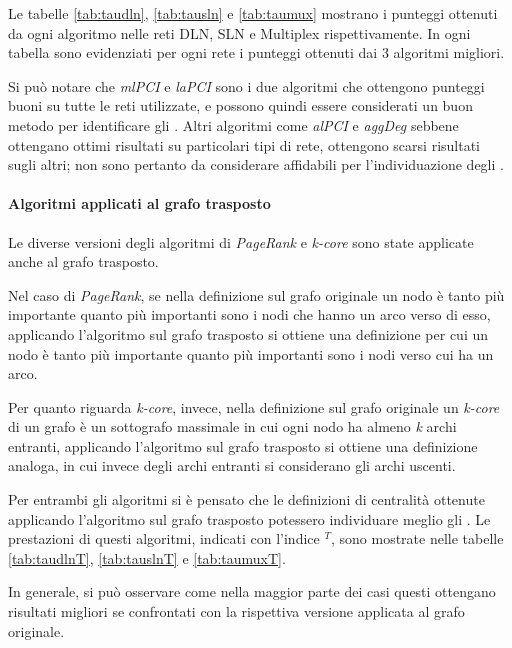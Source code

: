 Le tabelle \ref{tab:taudln}, \ref{tab:tausln} e \ref{tab:taumux} mostrano i punteggi 
ottenuti da ogni algoritmo nelle reti DLN, SLN e Multiplex rispettivamente.
In ogni tabella sono evidenziati per ogni rete i punteggi ottenuti dai \num{3} algoritmi 
migliori. 

Si può notare che \textit{mlPCI} e \textit{laPCI} sono i due algoritmi che ottengono punteggi buoni 
su tutte le reti utilizzate, e possono quindi essere considerati un buon metodo per identificare 
gli \infsp. 
Altri algoritmi come \textit{alPCI} e \textit{aggDeg} sebbene ottengano ottimi risultati su
particolari tipi di rete, ottengono scarsi risultati sugli altri; non sono pertanto da 
considerare affidabili per l'individuazione degli \infsp.





\paragraph{Algoritmi applicati al grafo trasposto}
Le diverse versioni degli algoritmi di \textit{PageRank} e \textit{k-core} sono state applicate anche al grafo trasposto.

Nel caso di \textit{PageRank}, se nella definizione sul grafo originale un nodo è tanto più importante quanto 
più importanti sono i nodi che hanno un arco verso di esso, applicando l'algoritmo sul grafo trasposto si ottiene
una definizione per cui un nodo è tanto più importante quanto più importanti sono i nodi verso cui ha un arco.

Per quanto riguarda \textit{k-core}, invece, nella definizione sul grafo originale un \textit{k-core} di un grafo è un sottografo 
massimale in cui ogni nodo ha almeno \textit{k} archi entranti, applicando l'algoritmo sul grafo trasposto si ottiene 
una definizione analoga, in cui invece degli archi entranti si considerano gli archi uscenti.

Per entrambi gli algoritmi si è pensato che le definizioni di centralità ottenute applicando l'algoritmo 
sul grafo trasposto potessero individuare meglio gli \infsp. Le prestazioni di questi algoritmi, indicati 
con l'indice $^T$, sono mostrate nelle tabelle \ref{tab:taudlnT}, \ref{tab:tauslnT} e \ref{tab:taumuxT}.

In generale, si può osservare come nella maggior parte dei casi questi ottengano risultati migliori se confrontati con 
la rispettiva versione applicata al grafo originale. 




